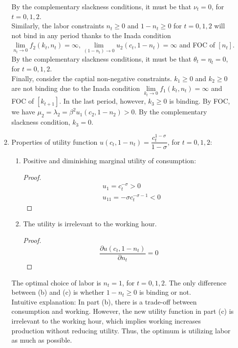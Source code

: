 \documentclass{article}
\begin{document}
\begin{enumerate}
\begin{enumerate}
        By the complementary slackness conditions, it must be that $\nu_t=0$, for $t=0,1,2$.\\
        Similarly, the labor constraints $n_t\ge0$ and $1-n_t\ge0$ for $t=0,1,2$ will not bind in any period thanks to the Inada condition $\lim\limits_{n_t\to0}f_2(k_t,n_t)=\infty,\lim\limits_{(1-n_t)\to0}u_2(c_t,1-n_t)=\infty$ and FOC of \([n_t]\).
        By the complementary slackness conditions, it must be that $\theta_t=\eta_t=0$, for $t=0,1,2$.\\
        Finally, consider the captial non-negative constraints. $k_1\ge0$ and $k_2\ge0$ are not binding due to the Inada condition $\lim\limits_{k_t\to0}f_1(k_t,n_t)=\infty$ and FOC of \([k_{t+1}]\). In the last period, however, $k_3\ge0$ is binding. 
        By FOC, we have $\mu_2=\lambda_2=\beta^2u_1(c_2,1-n_2)>0$. By the complementary slackness condition, $k_3=0$.
        \item Properties of utility function $u(c_t,1-n_t)=\dfrac{c_t^{1-\sigma}}{1-\sigma}$, for $t=0,1,2$:
        \begin{enumerate}
            \item Positive and diminishing marginal utility of consumption:
            \begin{proof}
                \begin{align*}
                    &u_1=c_t^{-\sigma}>0\\
                    &u_{11}=-\sigma c_t^{-\sigma-1}<0
                \end{align*}
            \end{proof}
            \item The utility is irrelevant to the working hour.
            \begin{proof}
                \begin{equation*}
                    \frac{\partial u(c_t,1-n_t)}{\partial n_t}=0
                \end{equation*}
            \end{proof}
        \end{enumerate}
        The optimal choice of labor is $n_t=1$, for $t=0,1,2$. The only difference between (b) and (c) is whether \(1-n_t\ge0\) is binding or not.\\
        Intuitive explanation: In part (b), there is a trade-off between consumption and working. 
        However, the new utility function in part (c) is irrelevant to the working hour, which implies working increases production without reducing utility.
        Thus, the optimum is utilizing labor as much as possible.

\end{enumerate}
\end{enumerate}
\end{document}
